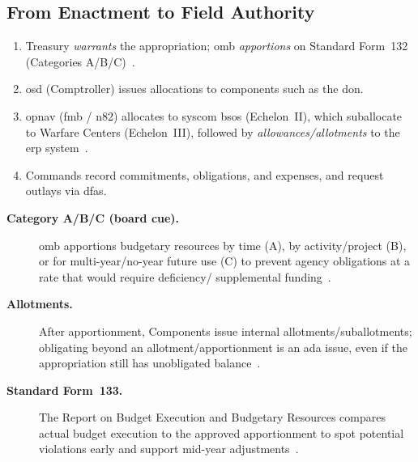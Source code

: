 \documentclass[../main.tex]{subfiles}
\begin{document}
\subsection{From Enactment to Field Authority}
\begin{enumerate}
  \item Treasury \emph{warrants} the appropriation; \ac{omb} \emph{apportions} on Standard Form~132 (Categories A/B/C)~\autocite{USC-1512-Apportionment,OMB-A11}.
  \item \ac{osd} (Comptroller) issues allocations to components such as the \ac{don}.
  \item \ac{opnav} (\ac{fmb} / \ac{n82}) allocates to \ac{syscom} \acp{bso} (Echelon~II), which suballocate to Warfare Centers (Echelon~III), followed by \emph{allowances/allotments} to the \ac{erp} system~\autocite{DoDFMR-Vol3}.
  \item Commands record commitments, obligations, and expenses, and request outlays via \ac{dfas}.
\end{enumerate}
\begin{description}
  \item[\textbf{Category A/B/C (board cue).}] \ac{omb} apportions budgetary resources by time (A), by activity/project (B), or for multi-year/no-year future use (C) to prevent agency obligations at a rate that would require deficiency/ supplemental funding~\autocite{OMB-A11,USC-1512-Apportionment}.
  \item[\textbf{Allotments.}] After apportionment, Components issue internal allotments/suballotments; obligating beyond an allotment/apportionment is an \ac{ada} issue, even if the appropriation still has unobligated balance~\autocite{USC-1341-ADA,DoDFMR-Vol3}.
  \item[\textbf{Standard Form~133.}] The Report on Budget Execution and Budgetary Resources compares actual budget execution to the approved apportionment to spot potential violations early and support mid-year adjustments~\autocite{OMB-A11}.
\end{description}
\end{document}
